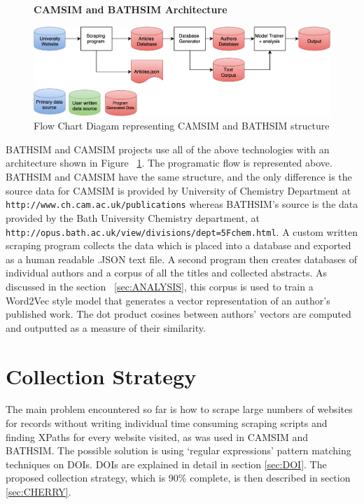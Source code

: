 \documentclass[11pt, oneside]{article}   	%
\begin{document}
\begin{figure}
    \centering
    \textbf{CAMSIM and BATHSIM Architecture}\par\medskip
    \includegraphics[scale=0.23]{CAMSIM.png}
    \caption{Flow Chart Diagam representing CAMSIM and BATHSIM structure \label{fig:CAMSIM}}
\end{figure}

BATHSIM and CAMSIM projects use all of the above technologies with an architecture shown in Figure ~\ref{fig:CAMSIM}. The programatic flow is represented above. BATHSIM and CAMSIM have the same structure, and the only difference is the source data for CAMSIM is provided by University of Chemistry Department at \texttt{ http://www.ch.cam.ac.uk/publications} whereas BATHSIM's source is the data provided by the Bath University Chemistry department, at \texttt{http://opus.bath.ac.uk/view/divisions/dept=5Fchem.html}. A custom written scraping program collects the data which is placed into a database and exported as a human readable .JSON text file. A second program then creates databases of individual authors and a corpus of all the titles and collected abstracts. As discussed in the section ~\ref{sec:ANALYSIS}, this corpus is used to train a Word2Vec style model that generates a vector representation of an author's published work. The dot product cosines between authors' vectors are computed and outputted as a measure of their similarity.
\section{Collection Strategy}
\label{sec:COLLECTIONSTRATEGY}
The main problem encountered so far is how to scrape large numbers of websites for records without writing individual time consuming scraping scripts and finding XPaths for every website visited, as was used in CAMSIM and BATHSIM. The possible solution is using `regular expressions' pattern matching techniques on DOIs. DOIs are explained in detail in section \ref{sec:DOI}. The proposed collection strategy, which is 90\% complete, is then described in section \ref{sec:CHERRY}.
\end{document}
